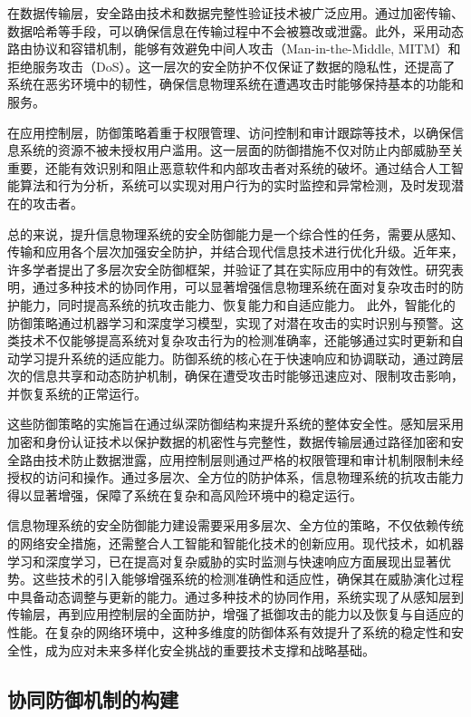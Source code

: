 在数据传输层，安全路由技术和数据完整性验证技术被广泛应用。通过加密传输、数据哈希等手段，可以确保信息在传输过程中不会被篡改或泄露。此外，采用动态路由协议和容错机制，能够有效避免中间人攻击（Man-in-the-Middle, MITM）和拒绝服务攻击（DoS）。这一层次的安全防护不仅保证了数据的隐私性，还提高了系统在恶劣环境中的韧性，确保信息物理系统在遭遇攻击时能够保持基本的功能和服务。

在应用控制层，防御策略着重于权限管理、访问控制和审计跟踪等技术，以确保信息系统的资源不被未授权用户滥用。这一层面的防御措施不仅对防止内部威胁至关重要，还能有效识别和阻止恶意软件和内部攻击者对系统的破坏。通过结合人工智能算法和行为分析，系统可以实现对用户行为的实时监控和异常检测，及时发现潜在的攻击者。

总的来说，提升信息物理系统的安全防御能力是一个综合性的任务，需要从感知、传输和应用各个层次加强安全防护，并结合现代信息技术进行优化升级。近年来，许多学者提出了多层次安全防御框架，并验证了其在实际应用中的有效性。研究表明，通过多种技术的协同作用，可以显著增强信息物理系统在面对复杂攻击时的防护能力，同时提高系统的抗攻击能力、恢复能力和自适应能力。
此外，智能化的防御策略通过机器学习和深度学习模型，实现了对潜在攻击的实时识别与预警。这类技术不仅能够提高系统对复杂攻击行为的检测准确率，还能够通过实时更新和自动学习提升系统的适应能力。防御系统的核心在于快速响应和协调联动，通过跨层次的信息共享和动态防护机制，确保在遭受攻击时能够迅速应对、限制攻击影响，并恢复系统的正常运行。

这些防御策略的实施旨在通过纵深防御结构来提升系统的整体安全性。感知层采用加密和身份认证技术以保护数据的机密性与完整性，数据传输层通过路径加密和安全路由技术防止数据泄露，应用控制层则通过严格的权限管理和审计机制限制未经授权的访问和操作。通过多层次、全方位的防护体系，信息物理系统的抗攻击能力得以显著增强，保障了系统在复杂和高风险环境中的稳定运行。

信息物理系统的安全防御能力建设需要采用多层次、全方位的策略，不仅依赖传统的网络安全措施，还需整合人工智能和智能化技术的创新应用。现代技术，如机器学习和深度学习，已在提高对复杂威胁的实时监测与快速响应方面展现出显著优势。这些技术的引入能够增强系统的检测准确性和适应性，确保其在威胁演化过程中具备动态调整与更新的能力。通过多种技术的协同作用，系统实现了从感知层到传输层，再到应用控制层的全面防护，增强了抵御攻击的能力以及恢复与自适应的性能。在复杂的网络环境中，这种多维度的防御体系有效提升了系统的稳定性和安全性，成为应对未来多样化安全挑战的重要技术支撑和战略基础。

\subsection{协同防御机制的构建}

